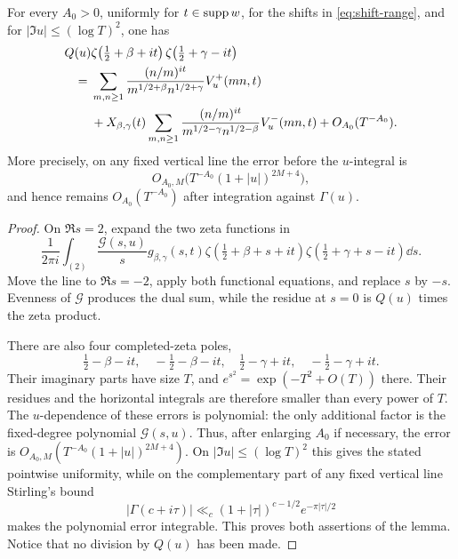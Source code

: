 \begin{lemma}
\label{lem:afe}
For every $A_0>0$, uniformly for $t\in\mathop{\rm supp} w$, for the shifts in
\eqref{eq:shift-range}, and for $|\Im u|\leq(\log T)^2$, one has
\begin{align}
 Q(u)&\zeta\!\left(\tfrac12+\beta+it\right)
       \zeta\!\left(\tfrac12+\gamma-it\right) \notag\\
 ={}&\sum_{m,n\geq1}\frac{(n/m)^{it}}
  {m^{1/2+\beta}n^{1/2+\gamma}}V_u^+(mn,t) \notag\\
 &+X_{\beta,\gamma}(t)
 \sum_{m,n\geq1}\frac{(n/m)^{it}}
  {m^{1/2-\gamma}n^{1/2-\beta}}V_u^-(mn,t)
 +O_{A_0}(T^{-A_0}).
 \label{eq:afe}
\end{align}
 More precisely, on any fixed vertical line the error before the $u$-integral
 is
 \[
  O_{A_0,M}\bigl(T^{-A_0}(1+|u|)^{2M+4}\bigr),
 \]
 and hence remains $O_{A_0}(T^{-A_0})$ after integration against
 $\Gamma(u)$.
\end{lemma}

\begin{proof}
On $\Re s=2$, expand the two zeta functions in
\[
 \frac{1}{2\pi i}\int_{(2)}\frac{\mathcal G(s,u)}s
 g_{\beta,\gamma}(s,t)
 \zeta\!\left(\tfrac12+\beta+s+it\right)
 \zeta\!\left(\tfrac12+\gamma+s-it\right)\dd s.
\]
Move the line to $\Re s=-2$, apply both functional equations, and replace
$s$ by $-s$.  Evenness of $\mathcal G$ produces the dual sum, while the
residue at $s=0$ is $Q(u)$ times the zeta product.

There are also four completed-zeta poles,
\[
 \tfrac12-\beta-it,\quad-\tfrac12-\beta-it,
 \quad\tfrac12-\gamma+it,\quad-\tfrac12-\gamma+it.
\]
Their imaginary parts have size $T$, and $e^{s^2}=\exp(-T^2+O(T))$ there.
 Their residues and the horizontal integrals are therefore smaller than every
 power of $T$.  The $u$-dependence of these errors is polynomial: the only
 additional factor is the fixed-degree polynomial $\mathcal G(s,u)$.  Thus,
 after enlarging $A_0$ if necessary, the error is
 $O_{A_0,M}(T^{-A_0}(1+|u|)^{2M+4})$.  On
 $|\Im u|\leq(\log T)^2$ this gives the stated pointwise uniformity, while on
 the complementary part of any fixed vertical line Stirling's bound
 \[
  |\Gamma(c+i\tau)|\ll_c(1+|\tau|)^{c-1/2}e^{-\pi|\tau|/2}
 \]
 makes the polynomial error integrable.  This proves both assertions of the
 lemma.  Notice that no division by $Q(u)$ has been made.
\end{proof}

